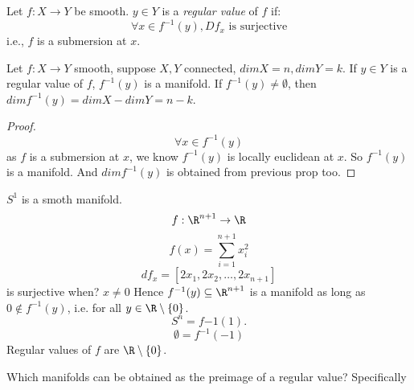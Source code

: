 \begin{definition}
  Let $f: X \to Y$ be smooth. $y\in Y$ is a \emph{regular value} of $f$ if:
    $$\forall x\in f ^{-1}(y), Df_x \text{ is surjective}$$
    i.e., $f$ is a submersion at $x$.
\end{definition}
\begin{theorem}
  Let $f: X \to Y$ smooth, suppose $X, Y$ connected, $dim X=n, dim Y =k$. If $y\in Y$ is a regular value of $f$, $f ^{-1}(y)$ is a manifold. If $f ^{-1}(y)\neq \emptyset$, then $dim f ^{-1}(y)=dim X-dim Y=n-k$.
\end{theorem}
\begin{proof}
  $$\forall x\in f ^{-1}(y)$$
  as $f$ is a submersion at $x$, we know $f ^{-1}(y)$ is locally euclidean at $x$. So $f ^{-1}(y)$ is a manifold. And $dim f ^{-1}(y)$ is obtained from previous prop too.
\end{proof}
\begin{example}
  $S^1$ is a smoth manifold.
    $$f:\R^{n+1}\to \R$$
    $$f(x)=\sum_{i=1}^{n+1}x_i^2$$
    $$df_x=[2x_1,2x_2,\dots,2x_{n+1}]$$
  is surjective when?
  \newline $x\neq 0$
  \newline Hence $f ^{-1}(y)\subseteq \R^{n+1}$ is a manifold as long as $0\notin f ^{-1}(y)$, i.e. for all $y\in \R\setminus\{0\}$.
    $$S^n=f{-1}(1).$$
    $$\emptyset=f^{-1}(-1)$$
  Regular values of $f$ are $\R\setminus\{0\}$.
\end{example}
Which manifolds can be obtained as the preimage of a regular value?
\newline Specifically
